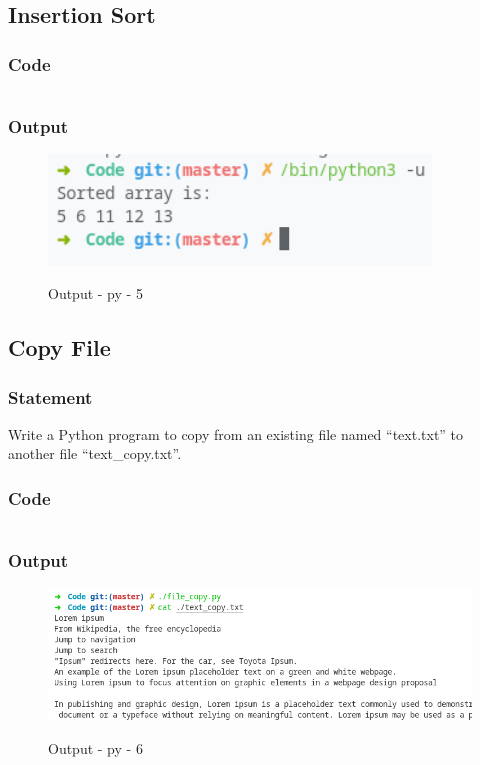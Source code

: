 \subsection{Insertion Sort}

\subsubsection{Code}

\inputminted[]{python}{../Code/insertion_sort.py}

\subsubsection{Output}
\begin{figure}[!htb]
  \centering
  \includegraphics[width=4in]{Images/insertion.png}
  \label{output:py-5}
  \caption{Output - py - 5}
\end{figure}
\pagebreak

\subsection{Copy File}

\subsubsection{Statement}
Write a Python program to copy from an existing file named “text.txt” to another file “text\_copy.txt”.

\subsubsection{Code}

\inputminted[]{python}{../Code/file_copy.py}

\subsubsection{Output}
\begin{figure}[!htb]
  \centering
  \includegraphics[width=5in]{Images/file_copy.png}
  \label{output:py-6}
  \caption{Output - py - 6}
\end{figure}
\pagebreak